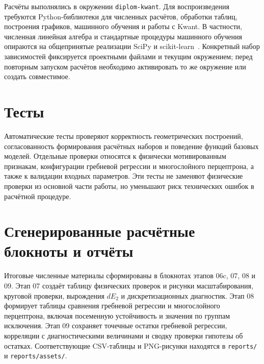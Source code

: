 Расчёты выполнялись в окружении \texttt{diplom-kwant}. Для воспроизведения требуются
Python-библиотеки для численных расчётов, обработки таблиц, построения графиков, машинного
обучения и работы с Kwant. В частности, численная линейная алгебра и стандартные процедуры
машинного обучения опираются на общепринятые реализации SciPy и
scikit-learn~\cite{virtanen2020scipy,pedregosa2011sklearn}. Конкретный набор зависимостей
фиксируется проектными файлами и текущим окружением; перед повторным запуском расчётов
необходимо активировать то же окружение или создать совместимое.

\section{Тесты}

Автоматические тесты проверяют корректность геометрических построений, согласованность
формирования расчётных наборов и поведение функций базовых моделей. Отдельные проверки
относятся к физически мотивированным признакам, конфигурации гребневой регрессии и
многослойного перцептрона, а также к валидации входных параметров. Эти тесты не заменяют
физические проверки из основной части работы, но уменьшают риск технических ошибок в
расчётной процедуре.

\section{Сгенерированные расчётные блокноты и отчёты}

Итоговые численные материалы сформированы в блокнотах этапов 06c, 07, 08 и 09. Этап 07
создаёт таблицу физических проверок и рисунки масштабирования, круговой проверки,
вырождения \(dE_2\) и дискретизационных диагностик. Этап 08 формирует таблицы сравнения
гребневой регрессии и многослойного перцептрона, включая посеменную устойчивость и
значения по группам исключения. Этап 09 сохраняет точечные остатки гребневой регрессии,
корреляции с диагностическими величинами и сводку проверки гипотезы об остатках.
Соответствующие CSV-таблицы и PNG-рисунки находятся в \texttt{reports/} и
\texttt{reports/assets/}.

\clearpage
